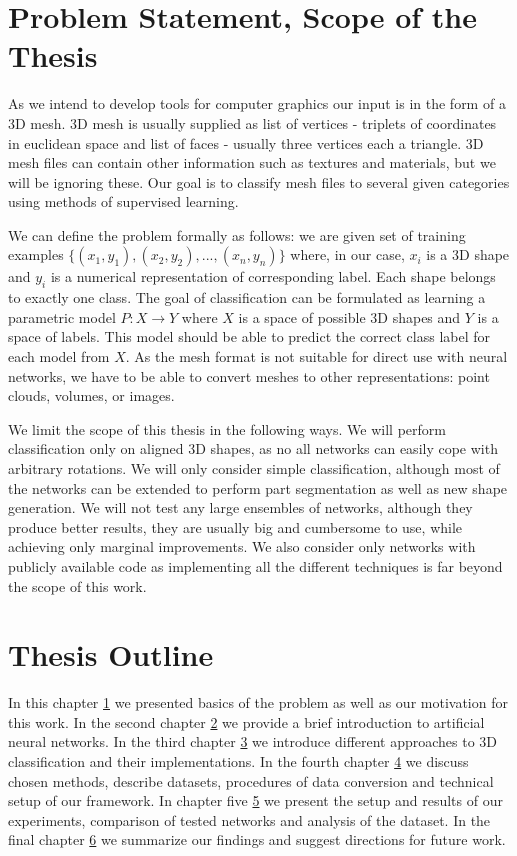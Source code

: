 \section{Problem Statement, Scope of the Thesis}
As we intend to develop tools for computer graphics our input is in the form of a 3D mesh. 3D mesh is usually supplied as list of vertices - triplets of coordinates in euclidean space and list of faces - usually three vertices each a triangle. 3D mesh files can contain other information such as textures and materials, but we will be ignoring these. Our goal is to classify mesh files to several given categories using methods of supervised learning.\par
We can define the problem formally as follows: we are given set of training examples $\{(x_1,y_1),(x_2,y_2), ..., (x_n,y_n)\}$ where, in our case, $x_i$ is a 3D shape and $y_i$ is a numerical representation of corresponding label. Each shape belongs to exactly one class. The goal of classification can be formulated as learning a parametric model $P:X \rightarrow Y$ where $X$ is a space of possible 3D shapes and $Y$ is a space of labels. This model should be able to predict the correct class label for each model from $X$.
As the mesh format is not suitable for direct use with neural networks, we have to be able to convert meshes to other representations: point clouds, volumes, or images.
\par
We limit the scope of this thesis in the following ways. We will perform classification only on aligned 3D shapes, as no all networks can easily cope with arbitrary rotations. We will only consider simple classification, although most of the networks can be extended to perform part segmentation as well as new shape generation. We will not test any large ensembles of networks, although they produce better results, they are usually big and cumbersome to use, while achieving only marginal improvements. We also consider only networks with publicly available code as implementing all the different techniques is far beyond the scope of this work.

\section{Thesis Outline}
In this chapter \hyperref[sec:chap1]{1} we presented basics of the problem as well as our motivation for this work. In the second chapter \hyperref[sec:chap2]{2} we provide a brief introduction to artificial neural networks. In the third chapter \hyperref[sec:chap3]{3} we introduce different approaches to 3D classification and their implementations. In the fourth chapter \hyperref[sec:chap4]{4} we discuss chosen methods, describe datasets, procedures of data conversion and technical setup of our framework. In chapter five \hyperref[sec:chap5]{5} we present the setup and results of our experiments, comparison of tested networks and analysis of the dataset. In the final chapter \hyperref[sec:chap6]{6} we summarize our findings and suggest directions for future work.
